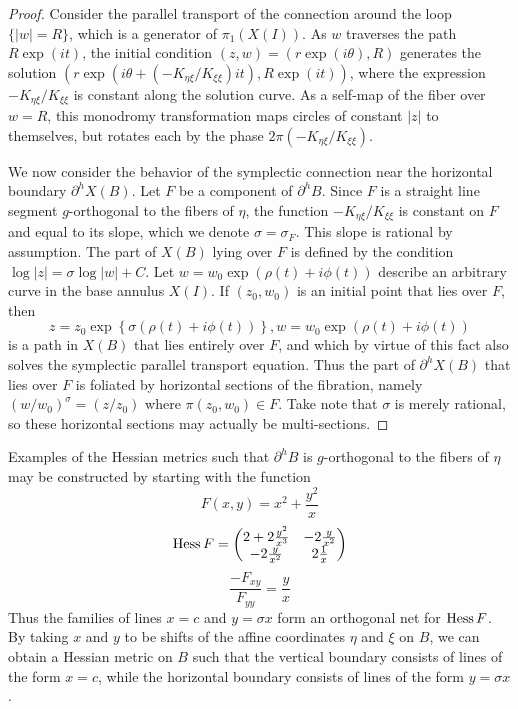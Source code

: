 \documentclass[12pt]{amsart}
\begin{document}
\begin{proof}
Consider the parallel transport of the connection around the loop $\{|w|
= R\}$, which is a generator of $\pi_1(X(I))$.
As $w$ traverses the path $R\exp(it)$, the initial
condition $(z,w) = (r\exp(i\theta), R)$ generates the solution $(r\exp
(i \theta + (-K_{\eta\xi}/K_{\xi\xi})it), R\exp(it))$, where the
expression $-K_{\eta\xi}/K_{\xi\xi}$ is constant along the solution
curve. As a self-map of the fiber over $w = R$, this monodromy
transformation maps circles of constant $|z|$ to themselves, but
rotates each by the phase $2\pi (-K_{\eta\xi}/K_{\xi\xi})$.

We now consider the behavior of the symplectic connection near the
horizontal boundary $\partial^h X(B)$. Let $F$
be a component of $\partial^h B$. Since $F$ is a straight line segment
$g$-orthogonal to the fibers of $\eta$, the function
$-K_{\eta\xi}/K_{\xi\xi}$ is constant on $F$ and equal to its slope,
which we denote $\sigma = \sigma_F$. This slope is rational by assumption. The part of $X(B)$ lying over $F$ is defined by the
condition $\log|z| = \sigma \log|w| + C$. Let $w = w_0\exp(\rho(t) + i
\phi(t))$ describe an arbitrary curve in the base annulus $X(I)$. If
$(z_0,w_0)$ is an initial point that lies over $F$, then
\begin{equation}
  z = z_0\exp\left\{\sigma(\rho(t)+i\phi(t))\right\}, w = w_0\exp(\rho(t)+i\phi(t))
\end{equation}
is a path in $X(B)$ that lies entirely over $F$, and which by virtue
of this fact also solves the symplectic parallel transport
equation. Thus the part of $\partial^h X(B)$ that lies over $F$ is
foliated by horizontal sections of the fibration, namely $(w/w_0)^\sigma =
(z/z_0)$ where $\pi(z_0,w_0) \in F$. Take note that $\sigma$ is merely
rational, so these horizontal sections may actually be multi-sections.
\end{proof}

Examples of the Hessian metrics such that $\partial^hB$ is
$g$-orthogonal to the fibers of $\eta$ may be constructed by starting
with the function
\begin{equation}
  F(x,y) = x^2 + \frac{y^2}{x} 
\end{equation}
\begin{equation}
  \operatorname{Hess} F = 
  \begin{pmatrix}
    2+ 2\frac{y^2}{x^3} & -2\frac{y}{x^2}\\
    -2 \frac{y}{x^2} & 2\frac{1}{x}
  \end{pmatrix}
\end{equation}
\begin{equation}
  \frac{-F_{xy}}{F_{yy}} = \frac{y}{x}
\end{equation}
Thus the families of lines $x = c$ and $y = \sigma x$ form an
orthogonal net for $\operatorname{Hess} F$. By taking $x$ and $y$ to be shifts of
the affine coordinates $\eta$ and $\xi$ on $B$, we can obtain a
Hessian metric on $B$ such that the vertical boundary consists of lines
of the form $x = c$, while the horizontal boundary consists of
lines of the form $y = \sigma x$.
\end{document}
